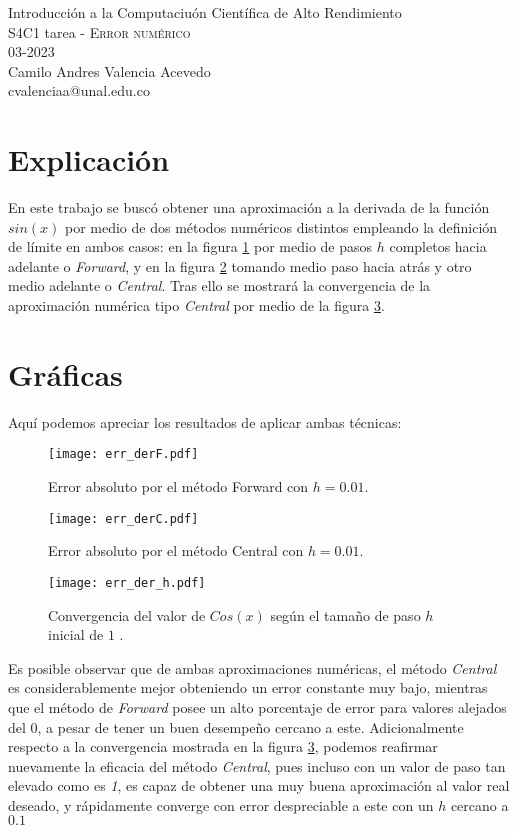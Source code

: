 \documentclass[11pt,letterpaper]{exam}
\begin{document}
\begin{center}
{\Large Introducción a la Computaciuón Científica de Alto Rendimiento} \\
S4C1 tarea - \textsc{Error numérico}\\
03-2023\\
Camilo Andres Valencia Acevedo\\
cvalenciaa@unal.edu.co
\end{center}


\section{Explicación}
En este trabajo se buscó obtener una aproximación a la derivada de la función $sin(x)$ por medio de dos métodos numéricos distintos empleando la definición de límite en ambos casos: en la figura \ref{fig:forward} por medio de pasos $h$ completos hacia adelante o \textit{Forward}, y en la figura \ref{fig:central} tomando medio paso hacia atrás y otro medio adelante o \textit{Central}.
Tras ello se mostrará la convergencia de la aproximación numérica tipo \textit{Central} por medio de la figura \ref{fig:convergencia}.

\noindent
\section{Gr\'aficas}
Aquí podemos apreciar los resultados de aplicar ambas técnicas:
\begin{figure}[H]
    \centering
    \texttt{[image: err\_derF.pdf]} 
    \caption{Error absoluto por el método Forward con $h=0.01$.}
    \label{fig:forward}
\end{figure}

\begin{figure}[H]
    \centering
    \texttt{[image: err\_derC.pdf]} 
    \caption{Error absoluto por el método Central con $h=0.01$.}
    \label{fig:central}
\end{figure}

\begin{figure}[H]
    \centering
    \texttt{[image: err\_der\_h.pdf]} 
    \caption{Convergencia del valor de $Cos(x)$ según el tamaño de paso $h$ inicial de $1$ .}
    \label{fig:convergencia}
\end{figure}

Es posible observar que de ambas aproximaciones numéricas, el método \textit{Central} es considerablemente mejor obteniendo un error constante muy bajo, mientras que el método de \textit{Forward} posee un alto porcentaje de error para valores alejados del 0, a pesar de tener un buen desempeño cercano a este.
Adicionalmente respecto a la convergencia mostrada en la figura \ref{fig:convergencia}, podemos reafirmar nuevamente la eficacia del método \textit{Central}, pues incluso con un valor de paso tan elevado como es \textit{1}, es capaz de obtener una muy buena aproximación al valor real deseado, y rápidamente converge con error despreciable a este con un $h$ cercano a $0.1$
\end{document}
